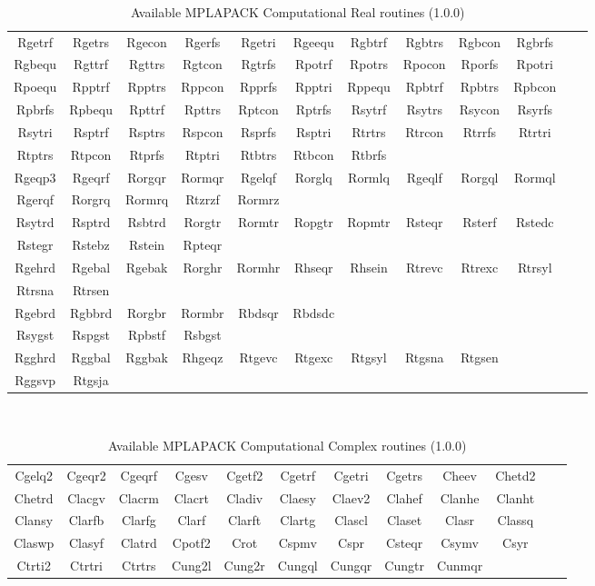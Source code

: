 \documentclass[12pt]{article}
\begin{document}
\begin{table}
\caption{Available MPLAPACK Computational Real routines (1.0.0)}\label{mplapackcomp}
\begin{center}
{\tt
\begin{tabular}{cccccccccccc} \hline
Rgetrf & Rgetrs & Rgecon & Rgerfs & Rgetri & Rgeequ & Rgbtrf & Rgbtrs & Rgbcon & Rgbrfs \\
Rgbequ & Rgttrf & Rgttrs & Rgtcon & Rgtrfs & Rpotrf & Rpotrs & Rpocon & Rporfs & Rpotri \\
Rpoequ & Rpptrf & Rpptrs & Rppcon & Rpprfs & Rpptri & Rppequ & Rpbtrf & Rpbtrs & Rpbcon \\
Rpbrfs & Rpbequ & Rpttrf & Rpttrs & Rptcon & Rptrfs & Rsytrf & Rsytrs & Rsycon & Rsyrfs \\
Rsytri & Rsptrf & Rsptrs & Rspcon & Rsprfs & Rsptri & Rtrtrs & Rtrcon & Rtrrfs & Rtrtri \\
Rtptrs & Rtpcon & Rtprfs & Rtptri & Rtbtrs & Rtbcon & Rtbrfs \\ \hline
Rgeqp3 & Rgeqrf & Rorgqr & Rormqr & Rgelqf & Rorglq & Rormlq & Rgeqlf & Rorgql & Rormql \\
Rgerqf & Rorgrq & Rormrq & Rtzrzf & Rormrz \\ \hline
Rsytrd & Rsptrd & Rsbtrd & Rorgtr & Rormtr & Ropgtr & Ropmtr & Rsteqr & Rsterf & Rstedc \\
Rstegr & Rstebz & Rstein & Rpteqr \\ \hline
Rgehrd & Rgebal & Rgebak & Rorghr & Rormhr & Rhseqr & Rhsein & Rtrevc & Rtrexc & Rtrsyl \\
Rtrsna & Rtrsen \\ \hline
Rgebrd & Rgbbrd & Rorgbr & Rormbr & Rbdsqr & Rbdsdc \\ \hline
Rsygst & Rspgst & Rpbstf & Rsbgst \\ \hline
Rgghrd & Rggbal & Rggbak & Rhgeqz & Rtgevc & Rtgexc & Rtgsyl & Rtgsna & Rtgsen \\ \hline
Rggsvp & Rtgsja \\
\hline
\end{tabular}
}
\end{center}
\end{table}

\begin{table}
\caption{Available MPLAPACK Computational Complex routines (1.0.0)}\label{mplapackcomp_complex}
\begin{center}
{\tt
\begin{tabular}{cccccccccccc} \hline
Cgelq2 & Cgeqr2 & Cgeqrf & Cgesv  & Cgetf2 & Cgetrf & Cgetri & Cgetrs & Cheev  & Chetd2 \\
Chetrd & Clacgv & Clacrm & Clacrt & Cladiv & Claesy & Claev2 & Clahef & Clanhe & Clanht \\
Clansy & Clarfb & Clarfg & Clarf  & Clarft & Clartg & Clascl & Claset & Clasr & Classq \\
Claswp & Clasyf & Clatrd & Cpotf2 & Crot   & Cspmv  &  Cspr & Csteqr  & Csymv & Csyr \\
Ctrti2 & Ctrtri & Ctrtrs & Cung2l & Cung2r & Cungql & Cungqr & Cungtr & Cunmqr \\ \hline
\end{tabular}
}
\end{center}
\end{table}
\end{document}
